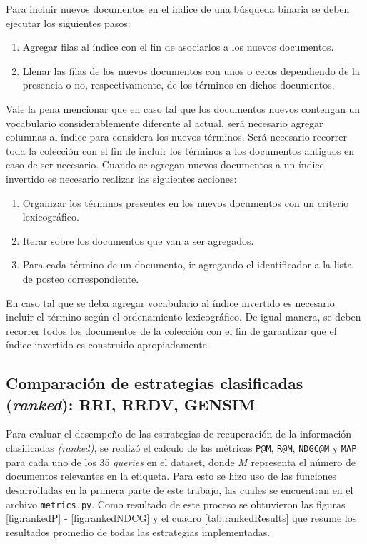 Para incluir nuevos documentos en el índice de una búsqueda binaria se deben ejecutar los siguientes pasos:

\begin{enumerate}
    \item Agregar filas al índice con el fin de asociarlos a los nuevos documentos.
    \item Llenar las filas de los nuevos documentos con unos o ceros dependiendo de la presencia o no, respectivamente, de los términos en dichos documentos.
\end{enumerate}

Vale la pena mencionar que en caso tal que los documentos nuevos contengan un vocabulario considerablemente diferente al actual, será necesario agregar columnas al índice para considera los nuevos términos. Será necesario recorrer toda la colección con el fin de incluir los términos a los documentos antiguos en caso de ser necesario. Cuando se agregan nuevos documentos a un índice invertido es necesario realizar las siguientes acciones:

\begin{enumerate}
    \item Organizar los términos presentes en los nuevos documentos con un criterio lexicográfico.
    \item Iterar sobre los documentos que van a ser agregados.
    \item Para cada término de un documento, ir agregando el identificador a la lista de posteo correspondiente.
\end{enumerate}

En caso tal que se deba agregar vocabulario al índice invertido es necesario incluir el término según el ordenamiento lexicográfico. De igual manera, se deben recorrer todos los documentos de la colección con el fin de garantizar que el índice invertido es construido apropiadamente.

\subsection{Comparación de estrategias clasificadas (\textit{ranked}): RRI, RRDV, GENSIM}

Para evaluar el desempeño de las estrategias de recuperación de la información clasificadas \textit{(ranked)}, se realizó el calculo de las métricas \texttt{P@M}, \texttt{R@M}, \texttt{NDGC@M} y \texttt{MAP} para cada uno de los 35 \textit{queries} en el dataset, donde $M$ representa el número de documentos relevantes en la etiqueta. Para esto se hizo uso de las funciones desarrolladas en la primera parte de este trabajo, las cuales se encuentran en el archivo \texttt{metrics.py}. Como resultado de este proceso se obtuvieron las figuras \ref{fig:rankedP} - \ref{fig:rankedNDCG} y el cuadro \ref{tab:rankedResults} que resume los resultados promedio de todas las estrategias implementadas. \\

